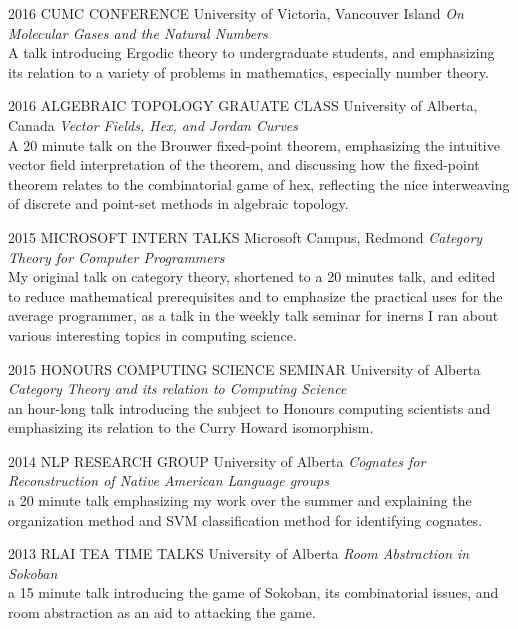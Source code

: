 \documentclass{friggeri-cv}
\begin{document}
\begin{entrylist}


\entry
{2016}
{CUMC CONFERENCE}
{University of Victoria, Vancouver Island}
{\emph{On Molecular Gases and the Natural Numbers}\\
A talk introducing Ergodic theory to undergraduate students, and emphasizing its relation to a variety of problems in mathematics, especially number theory.}


\entry
{2016}
{ALGEBRAIC TOPOLOGY GRAUATE CLASS}
{University of Alberta, Canada}
{\emph{Vector Fields, Hex, and Jordan Curves}\\
A 20 minute talk on the Brouwer fixed-point theorem, emphasizing the intuitive vector field interpretation of the theorem, and discussing how the fixed-point theorem relates to the combinatorial game of hex, reflecting the nice interweaving of discrete and point-set methods in algebraic topology.}


    
\entry
{2015}
{MICROSOFT INTERN TALKS}
{Microsoft Campus, Redmond}
{\emph{Category Theory for Computer Programmers}\\
My original talk on category theory, shortened to a 20 minutes talk, and edited to reduce mathematical prerequisites and to emphasize the practical uses for the average programmer, as a talk in the weekly talk seminar for inerns I ran about various interesting topics in computing science.}


\entry
{2015}
{HONOURS COMPUTING SCIENCE SEMINAR}
{University of Alberta}
{\emph{Category Theory and its relation to Computing Science}\\
an hour-long talk introducing the subject to Honours computing scientists and emphasizing its relation to the Curry Howard isomorphism.}


\entry
{2014}
{NLP RESEARCH GROUP}
{University of Alberta}
{\emph{Cognates for Reconstruction of Native American Language groups}\\
a 20 minute talk emphasizing my work over the summer and explaining the organization method and SVM classification method for identifying cognates.}


\entry
{2013}
{RLAI TEA TIME TALKS}
{University of Alberta}
{\emph{Room Abstraction in Sokoban}\\
a 15 minute talk introducing the game of Sokoban, its combinatorial issues, and room abstraction as an aid to attacking the game.}

\end{entrylist}
\end{document}
